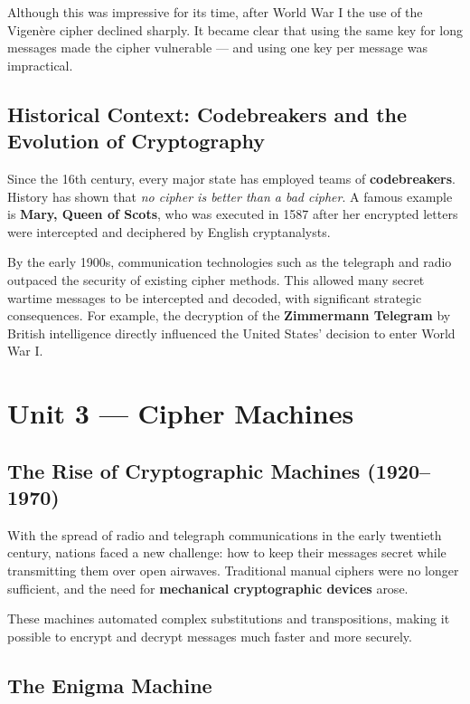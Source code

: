 Although this was impressive for its time, after World War I the use of the Vigenère cipher declined sharply.  
It became clear that using the same key for long messages made the cipher vulnerable — and using one key per message was impractical.

\subsection{Historical Context: Codebreakers and the Evolution of Cryptography}

Since the 16th century, every major state has employed teams of \textbf{codebreakers}.  
History has shown that \emph{no cipher is better than a bad cipher}.  
A famous example is \textbf{Mary, Queen of Scots}, who was executed in 1587 after her encrypted letters were intercepted and deciphered by English cryptanalysts.

By the early 1900s, communication technologies such as the telegraph and radio outpaced the security of existing cipher methods.  
This allowed many secret wartime messages to be intercepted and decoded, with significant strategic consequences.  
For example, the decryption of the \textbf{Zimmermann Telegram} by British intelligence directly influenced the United States’ decision to enter World War I.

\section{Unit 3 — Cipher Machines}

\subsection{The Rise of Cryptographic Machines (1920–1970)}

With the spread of radio and telegraph communications in the early twentieth century, nations faced a new challenge: how to keep their messages secret while transmitting them over open airwaves.  
Traditional manual ciphers were no longer sufficient, and the need for \textbf{mechanical cryptographic devices} arose.

These machines automated complex substitutions and transpositions, making it possible to encrypt and decrypt messages much faster and more securely.

\subsection{The Enigma Machine}

